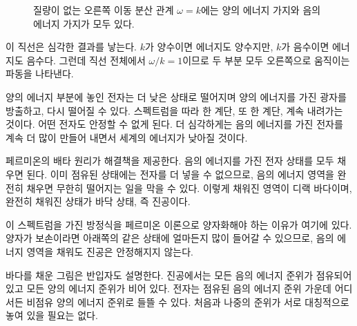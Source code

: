 \begin{figure}[htbp]
\centering
{}
\caption{질량이 없는 오른쪽 이동 분산 관계 \(\omega=k\)에는 양의 에너지 가지와 음의 에너지 가지가 모두 있다.}
\end{figure}

이 직선은 심각한 결과를 낳는다. \(k\)가 양수이면 에너지도 양수지만, \(k\)가 음수이면 에너지도 음수다. 그런데 직선 전체에서 \(\omega/k=1\)이므로 두 부분 모두 오른쪽으로 움직이는 파동을 나타낸다.

양의 에너지 부분에 놓인 전자는 더 낮은 상태로 떨어지며 양의 에너지를 가진 광자를 방출하고, 다시 떨어질 수 있다. 스펙트럼을 따라 한 계단, 또 한 계단, 계속 내려가는 것이다. 어떤 전자도 안정할 수 없게 된다. 더 심각하게는 음의 에너지를 가진 전자를 계속 더 많이 만들어 내면서 세계의 에너지가 낮아질 것이다.

페르미온의 배타 원리가 해결책을 제공한다. 음의 에너지를 가진 전자 상태를 모두 채우면 된다. 이미 점유된 상태에는 전자를 더 넣을 수 없으므로, 음의 에너지 영역을 완전히 채우면 무한히 떨어지는 일을 막을 수 있다. 이렇게 채워진 영역이 디랙 바다이며, 완전히 채워진 상태가 바닥 상태, 즉 진공이다.

\begin{classroomqa}
\end{classroomqa}

이 스펙트럼을 가진 방정식을 페르미온 이론으로 양자화해야 하는 이유가 여기에 있다. 양자가 보손이라면 아래쪽의 같은 상태에 얼마든지 많이 들어갈 수 있으므로, 음의 에너지 영역을 채워도 진공은 안정해지지 않는다.

바다를 채운 그림은 반입자도 설명한다. 진공에서는 모든 음의 에너지 준위가 점유되어 있고 모든 양의 에너지 준위가 비어 있다. 전자는 점유된 음의 에너지 준위 가운데 어디서든 비점유 양의 에너지 준위로 들뜰 수 있다. 처음과 나중의 준위가 서로 대칭적으로 놓여 있을 필요는 없다.

